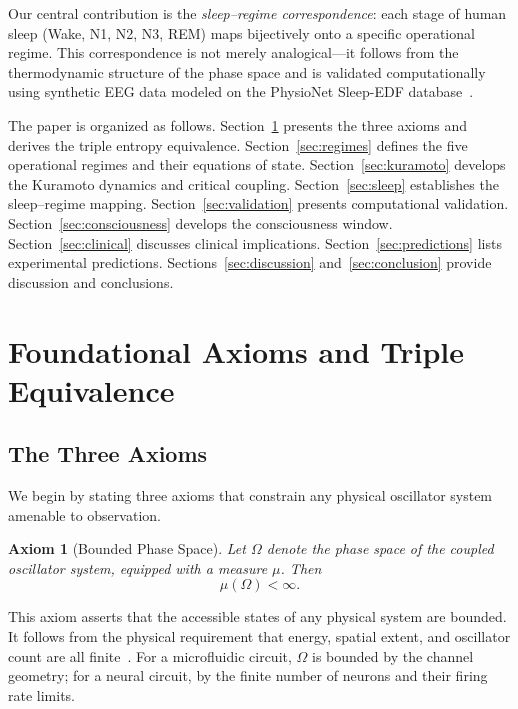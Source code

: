 \documentclass[aps,prd,twocolumn,superscriptaddress,floatfix,nofootinbib]{revtex4-2}
\newtheorem{axiom}{Axiom}
\theoremstyle{remark}
\begin{document}
Our central contribution is the \emph{sleep--regime correspondence}: each stage of human sleep (Wake, N1, N2, N3, REM) maps bijectively onto a specific operational regime. This correspondence is not merely analogical---it follows from the thermodynamic structure of the phase space and is validated computationally using synthetic EEG data modeled on the PhysioNet Sleep-EDF database~\cite{kemp2000analysis,goldberger2000physiobank}.

The paper is organized as follows. Section~\ref{sec:axioms} presents the three axioms and derives the triple entropy equivalence. Section~\ref{sec:regimes} defines the five operational regimes and their equations of state. Section~\ref{sec:kuramoto} develops the Kuramoto dynamics and critical coupling. Section~\ref{sec:sleep} establishes the sleep--regime mapping. Section~\ref{sec:validation} presents computational validation. Section~\ref{sec:consciousness} develops the consciousness window. Section~\ref{sec:clinical} discusses clinical implications. Section~\ref{sec:predictions} lists experimental predictions. Sections~\ref{sec:discussion} and~\ref{sec:conclusion} provide discussion and conclusions.

\section{Foundational Axioms and Triple Equivalence}
\label{sec:axioms}

\subsection{The Three Axioms}

We begin by stating three axioms that constrain any physical oscillator system amenable to observation.

\begin{axiom}[Bounded Phase Space]
\label{ax:bounded}
Let $\Omega$ denote the phase space of the coupled oscillator system, equipped with a measure $\mu$. Then
\begin{equation}
    \boxed{\mu(\Omega) < \infty.}
    \label{eq:bounded}
\end{equation}
\end{axiom}

This axiom asserts that the accessible states of any physical system are bounded. It follows from the physical requirement that energy, spatial extent, and oscillator count are all finite~\cite{callen1985thermodynamics,landau1980statistical}. For a microfluidic circuit, $\Omega$ is bounded by the channel geometry; for a neural circuit, by the finite number of neurons and their firing rate limits.
\end{document}

